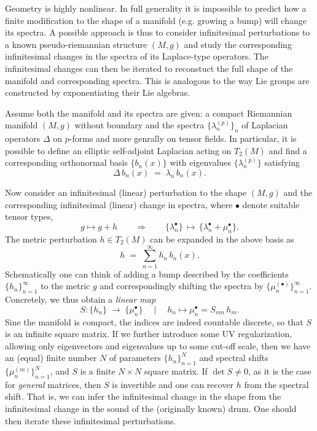 \documentclass[../geometry_main.tex]{subfiles}
\begin{document}
\begin{mytheorem}
%    
Geometry is highly nonlinear.
In full generality it is impossible to predict how a finite modification to the shape of a manifold (e.g. growing a bump) will change its spectra.
A possible approach is thus to consider infinitesimal perturbations to a known pseudo-riemannian structure $(M,g)$ and study the corresponding infinitesimal changes in the spectra of its Laplace-type operators.
The infinitesimal changes can then be iterated to reconstuct the full shape of the manifold and corresponding spectra.
This is analogous to the way Lie groups are constructed by exponentiating their Lie algebras. 


Assume both the manifold and its spectra are given: a compact Riemannian manifold \((M,g)\) without boundary and the spectra \(\{\lambda_n^{(p)}\}_n\) of Laplacian operators  \(\Delta\) on $p$-forms and more genrally on tensor fields.
%
In particular, it is possible to define an elliptic self-adjoint Laplacian acting on $T_2(M)$ and find a corresponding orthonormal basis \(\{b_n(x)\}\) with eigenvalues \(\{\lambda_n^{(p)}\}\) satisfying
\begin{equation}
 \Delta\, b_n(x) \;=\; \lambda_n\, b_n(x).
\end{equation}

Now consider an infinitesimal (linear) perturbation to the shape $(M,g)$ and the corresponding infinitesimal (linear) change in  spectra, where $\bullet$ denote suitable tensor types,
\begin{equation}
    g\mapsto g+h\qquad \Rightarrow\qquad \{\lambda_n^{\bullet}\}\,\mapsto\,
 \{\lambda_n^{\bullet}+\mu_n^{\bullet}\}.
\end{equation}
%
The metric perturbation \(h\in T_2(M)\) can be expanded in the above basis as
\begin{equation}
 h \;=\; \sum_{n=1}^\infty h_n\, b_n(x).
\end{equation}
Schematically one can think of adding a bump described by the coefficients \(\{h_n\}_{n=1}^\infty\) to the metric \(g\) and correspondingly shifting the spectra by \(\{\mu_n^{(\bullet)}\}_{n=1}^\infty\).
% 
Concretely, we thus obtain a \emph{linear map}
\begin{equation}
    S\colon \{h_n\}\;\longrightarrow\;\{\mu_n^\bullet\}\quad \mid \quad h_n \mapsto \mu_n^\bullet = S_{mn}\,h_m.
\end{equation}
Sine the manifold is compact, the indices are indeed countable discrete, so that $S$ is an infinite square matrix.
If we further introduce some UV regularization, allowing only eigenvectors and eigenvalues up to some cut-off scale, then we have an (equal) finite number $N$ of parameters \(\{h_n\}_{n=1}^N\) and spectral shifts \(\{\mu_n^{(m)}\}_{n=1}^N\), and $S$ is a finite \(N\times N\) square matrix.
If \(\det S\neq 0\), as it is the case for \emph{general} matrices, then \(S\) is invertible and one can recover \(h\) from the spectral shift.
That is, we can infer the infinitesimal change in the shape from the infinitesimal change in the sound of the (originally known) drum.
One should then iterate these infinitesimal perturbations.


\end{mytheorem}
\end{document}
